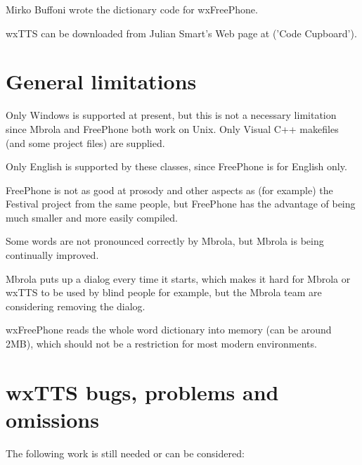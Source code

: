 Mirko Buffoni wrote the dictionary code for wxFreePhone.

wxTTS can be downloaded from Julian Smart's Web page at 
 ('Code Cupboard').

\section{General limitations}

Only Windows is supported at present, but this is not a necessary limitation
since Mbrola and FreePhone both work on Unix. Only Visual C++ makefiles (and some project
files) are supplied.

Only English is supported by these classes, since FreePhone is for English only.

FreePhone is not as good at prosody and other aspects as (for example) the Festival
project from the same people, but FreePhone has the advantage of being much smaller
and more easily compiled.

Some words are not pronounced correctly by Mbrola, but Mbrola is being continually improved.

Mbrola puts up a dialog every time it starts, which makes it hard for Mbrola or wxTTS to be used
by blind people for example, but the Mbrola team are considering removing the dialog.

wxFreePhone reads the whole word dictionary into memory (can be around 2MB), which
should not be a restriction for most modern environments.

\section{wxTTS bugs, problems and omissions}

The following work is still needed or can be considered:

